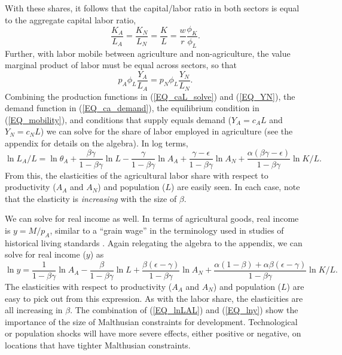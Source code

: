 \documentclass[11pt]{article}
\begin{document}
With these shares, it follows that the capital/labor ratio in both sectors is equal to the aggregate capital labor ratio,
\begin{equation}
    \frac{K_A}{L_A} = \frac{K_N}{L_N} = \frac{K}{L} = \frac{w}{r}\frac{\phi_K}{\phi_L}.
\end{equation}
Further, with labor mobile between agriculture and non-agriculture, the value marginal product of labor must be equal across sectors, so that
\begin{equation}
    p_A \phi_L \frac{Y_A}{L_A} = p_N \phi_L \frac{Y_N}{L_N}. \label{EQ_mobility}
\end{equation}
Combining the production functions in (\ref{EQ_caL_solve}) and (\ref{EQ_YN}), the demand function in (\ref{EQ_ca_demand}), the equilibrium condition in (\ref{EQ_mobility}), and conditions that supply equals demand ($Y_A = c_A L$ and $Y_N = c_N L$) we can solve for the share of labor employed in agriculture (see the appendix for details on the algebra). In log terms,
\begin{equation}
    \ln L_A/L = \ln \theta_A + \frac{\beta\gamma}{1-\beta\gamma} \ln L - \frac{\gamma}{1-\beta\gamma} \ln A_A + \frac{\gamma - \epsilon}{1-\beta\gamma} \ln A_N + \frac{\alpha(\beta\gamma - \epsilon)}{1-\beta\gamma} \ln K/L. \label{EQ_lnLAL}
\end{equation}
From this, the elasticities of the agricultural labor share with respect to productivity ($A_A$ and $A_N$) and population ($L$) are easily seen. In each case, note that the elasticity is \textit{increasing} with the size of $\beta$.

We can solve for real income as well. In terms of agricultural goods, real income is $y = M/p_A$, similar to a ``grain wage'' in the terminology used in studies of historical living standards \citep{allen2005,bg2006,allen11}. Again relegating the algebra to the appendix, we can solve for real income ($y$) as
\begin{equation}
    \ln y = \frac{1}{1-\beta\gamma} \ln A_A - \frac{\beta}{1-\beta\gamma} \ln L + \frac{\beta(\epsilon-\gamma)}{1-\beta\gamma} \ln A_N + \frac{\alpha(1-\beta) + \alpha\beta(\epsilon-\gamma)}{1-\beta\gamma} \ln K/L. \label{EQ_lny}
\end{equation}
The elasticities with respect to productivity ($A_A$ and $A_N$) and population ($L$) are easy to pick out from this expression. As with the labor share, the elasticities are all increasing in $\beta$. The combination of (\ref{EQ_lnLAL}) and (\ref{EQ_lny}) show the importance of the size of Malthusian constraints for development. Technological or population shocks will have more severe effects, either positive or negative, on locations that have tighter Malthusian constraints. 
\end{document}
